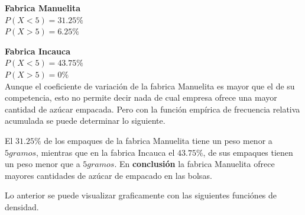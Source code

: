 \documentclass[12pt]{article}
\begin{document}
	\textbf{{\large Fabrica Manuelita}}\\
	$P(X<5) = 31.25\%$ \\
	$P(X>5) = 6.25\%$ \\
	\vspace{0.2cm}
	
	\textbf{{\large Fabrica Incauca}}\\
	$P(X<5) = 43.75\%$ \\
	$P(X>5) = 0\%$ \\
	
	Aunque el coeficiente de variación de la fabrica Manuelita es mayor que el de su competencia, esto no permite decir nada de cual empresa ofrece una mayor cantidad de azúcar empacada. Pero con la función empírica de frecuencia relativa acumulada se puede determinar lo siguiente.
	
	El $31.25\%$ de los empaques de la fabrica Manuelita tiene un peso menor a $5 gramos$, mientras que en la fabrica Incauca el  $43.75\%$, de sus empaques tienen un peso menor que a $5 gramos$.
	En \textbf{conclusión} la fabrica Manuelita ofrece mayores cantidades de azúcar de empacado en las bolsas. 
	
	Lo anterior se puede visualizar graficamente con las siguientes funciónes de densidad. \\
	
\end{document}
